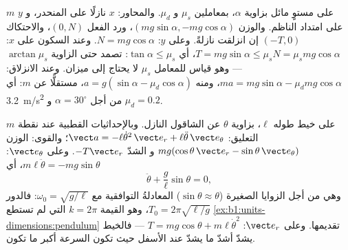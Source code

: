 \begin{example}\label{ex:b1:newton-dynamics:incline}
 $m$ على مستوٍ مائل بزاوية $\alpha$، بمعاملين $\mu_s$ و
$\mu_d$. والمحاور: $x$ نازلًا على المنحدر، و $y$ على امتداد الناظم. والوزن
$(mg\sin\alpha, -mg\cos\alpha)$، ورد الفعل $(0, N)$، والاحتكاك $(-T, 0)$
إن انزلقت نازلةً. وعلى $y$: $N = mg\cos\alpha$. وعند السكون على $x$:
$T = mg\sin\alpha \leq \mu_sN = \mu_smg\cos\alpha$، أي $\tan\alpha
\leq \mu_s$:  تصمد حتى الزاوية $\arctan\mu_s$ --- وهو
قياس للمعامل $\mu_s$ لا يحتاج إلى ميزان. وعند الانزلاق: $ma = mg\sin\alpha -
\mu_dmg\cos\alpha$، ومنه $a = g(\sin\alpha - \mu_d\cos\alpha)$، مستقلًّا
عن $m$: أي \qty{3.2}{m/s^2} من أجل $\alpha = 30^\circ$ و $\mu_d = 0.2$.
\end{example}

\begin{example}\label{ex:b1:newton-dynamics:pendulum}
 $m$ على خيط طوله $\ell$، بزاوية $\theta$ عن الشاقول
النازل. وبالإحداثيات القطبية عند نقطة التعليق: $\vect a =
-\ell\dot\theta^2\,\vect e_r + \ell\ddot\theta\,\vect e_\theta$؛ والقوى:
الوزن $mg(\cos\theta\,\vect e_r - \sin\theta\,\vect e_\theta)$ و
الشدّ $-T\vect e_r$. وعلى $\vect e_\theta$: $m\ell\ddot\theta =
-mg\sin\theta$، أي
\[
\ddot\theta + \frac{g}{\ell}\sin\theta = 0 ,
\]
وهي من أجل الزوايا الصغيرة ($\sin\theta \approx \theta$) المعادلةُ التوافقية
مع $\omega_0 = \sqrt{g/\ell}$: فالدور $T_0 = 2\pi\sqrt{\ell/g}$،
وهو القيمة $k = 2\pi$ التي لم تستطع \cref{ex:b1:units-dimensions:pendulum}
تقديمها. وعلى $\vect e_r$: $T = mg\cos\theta + m\ell\dot\theta^2$ --- فالخيط
يشدّ أشدّ ما يشدّ عند الأسفل حيث تكون السرعة أكبر ما تكون.
\end{example}

